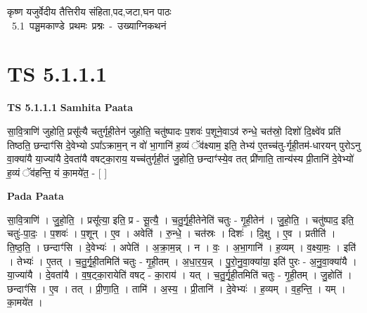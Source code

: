 \documentclass[17pt]{extarticle}
\begin{document}
\begin{titlepage}
    \begin{center}
 
\begin{sanskrit}
    { \Huge
    कृष्ण यजुर्वेदीय तैत्तिरीय संहिता,पद,जटा,घन पाठः 
    }
    \\
    \vspace{2.5cm}
    \mbox{ \Huge
    5.1      पञ्चमकाण्डे प्रथमः प्रश्नः - उख्याग्निकथनं   }
\end{sanskrit}
\end{center}

\end{titlepage}
\tableofcontents
\pagebreak

\section*{ TS 5.1.1.1 }

\textbf{TS 5.1.1.1 } \newline
\textbf{Samhita Paata} \newline

सा॒वि॒त्राणि॑ जुहोति॒ प्रसू᳚त्यै चतुर्गृही॒तेन॑ जुहोति॒ चतु॑ष्पादः प॒शवः॑ प॒शूने॒वाऽव॑ रुन्धे॒ चत॑स्रो॒ दिशो॑ दि॒क्ष्वे॑व प्रति॑ तिष्ठति॒ छन्दाꣳ॑सि दे॒वेभ्यो ऽपा᳚ऽक्राम॒न् न वो॑ भा॒गानि॑ ह॒व्यं ॅव॑क्ष्याम॒ इति॒ तेभ्य॑ ए॒तच्च॑तु-र्गृही॒तम॑-धारयन् पुरोऽनु वा॒क्या॑यै या॒ज्या॑यै दे॒वता॑यै वषट्का॒राय॒ यच्च॑तुर्गृही॒तं जु॒होति॒ छन्दाꣳ॑स्ये॒व तत् प्री॑णाति॒ तान्य॑स्य प्री॒तानि॑ दे॒वेभ्यो॑ ह॒व्यं ॅव॑हन्ति॒ यं का॒मये॑त॒ - [  ] \newline

\textbf{Pada Paata} \newline

सा॒वि॒त्राणि॑ । जु॒हो॒ति॒ । प्रसू᳚त्या॒ इति॒ प्र - सू॒त्यै॒ । च॒तु॒र्गृ॒ही॒तेनेति॑ चतुः - गृ॒ही॒तेन॑ । जु॒हो॒ति॒ । चतु॑ष्पाद॒ इति॒ चतुः॑-पा॒दः॒ । प॒शवः॑ । प॒शून् । ए॒व । अवेति॑ । रु॒न्धे॒ । चत॑स्रः । दिशः॑ । दि॒क्षु । ए॒व । प्रतीति॑ । ति॒ष्ठ॒ति॒ । छन्दाꣳ॑सि । दे॒वेभ्यः॑ । अपेति॑ । अ॒क्रा॒म॒न्न् । न । वः॒ । अ॒भा॒गानि॑ । ह॒व्यम् । व॒क्ष्या॒मः॒ । इति॑ । तेभ्यः॑ । ए॒तत् । च॒तु॒र्गृ॒ही॒तमिति॑ चतुः - गृ॒ही॒तम् । अ॒धा॒र॒य॒न्न् । पु॒रो॒नु॒वा॒क्या॑या॒ इति॑ पुरः - अ॒नु॒वा॒क्या॑यै । या॒ज्या॑यै । दे॒वता॑यै । व॒ष॒ट्का॒रायेति॑ वषट् - का॒राय॑ । यत् । च॒तु॒र्गृ॒ही॒तमिति॑ चतुः - गृ॒ही॒तम् । जु॒होति॑ । छन्दाꣳ॑सि । ए॒व । तत् । प्री॒णा॒ति॒ । तामि॑ । अ॒स्य॒ । प्री॒तानि॑ । दे॒वेभ्यः॑ । ह॒व्यम् । व॒ह॒न्ति॒ । यम् । का॒मये॑त ।  \newline
\end{document}
